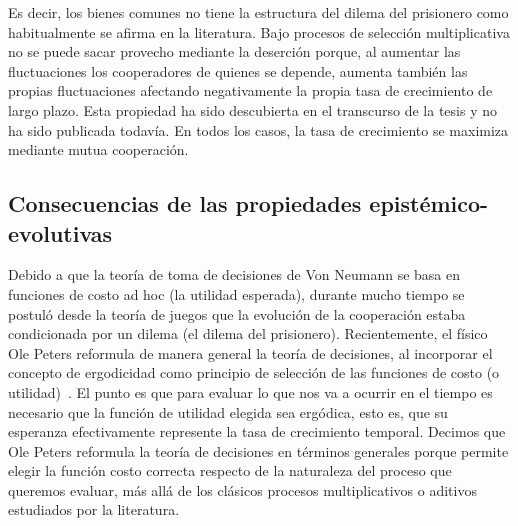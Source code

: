 \documentclass[a4paper,11pt]{book}
\theoremstyle{definition}
\begin{document}

Es decir, los bienes comunes no tiene la estructura del dilema del prisionero como habitualmente se afirma en la literatura.
%
Bajo procesos de selecci\'on multiplicativa no se puede sacar provecho mediante la deserci\'on porque, al aumentar las fluctuaciones los cooperadores de quienes se depende, aumenta tambi\'en las propias fluctuaciones afectando negativamente la propia tasa de crecimiento de largo plazo.
%
Esta propiedad ha sido descubierta en el transcurso de la tesis y no ha sido publicada todav\'ia.
%
En todos los casos, la tasa de crecimiento se maximiza mediante mutua cooperaci\'on.


\subsection{Consecuencias de las propiedades epist\'emico-evolutivas}

Debido a que la teor\'ia de toma de decisiones de Von Neumann se basa en funciones de costo ad hoc (la utilidad esperada), durante mucho tiempo se postul\'o desde la teor\'ia de juegos que la evoluci\'on de la cooperaci\'on estaba condicionada por un dilema (el dilema del prisionero).
%
Recientemente, el f\'isico Ole Peters reformula de manera general la teor\'ia de decisiones, al incorporar el concepto de ergodicidad como principio de selecci\'on de las funciones de costo (o utilidad)~\cite{peters2019-ergodicityEconomics,peters2021-interpretation}.
%
El punto es que para evaluar lo que nos va a ocurrir en el tiempo es necesario que la funci\'on de utilidad elegida sea erg\'odica, esto es, que su esperanza efectivamente represente la tasa de crecimiento temporal.
%
Decimos que Ole Peters reformula la teor\'ia de decisiones en t\'erminos generales porque permite elegir la funci\'on costo correcta respecto de la naturaleza del proceso que queremos evaluar, m\'as all\'a de los cl\'asicos procesos multiplicativos o aditivos estudiados por la literatura.

\end{document}
